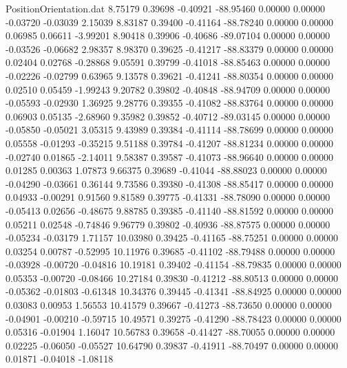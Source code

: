 \begin{filecontents}{PositionOrientation.dat}
   8.75179    0.39698   -0.40921   -88.95460    0.00000    0.00000   -0.03720   -0.03039    2.15039
   8.83187    0.39400   -0.41164   -88.78240    0.00000    0.00000    0.06985    0.06611   -3.99201
   8.90418    0.39906   -0.40686   -89.07104    0.00000    0.00000   -0.03526   -0.06682    2.98357
   8.98370    0.39625   -0.41217   -88.83379    0.00000    0.00000    0.02404    0.02768   -0.28868
   9.05591    0.39799   -0.41018   -88.85463    0.00000    0.00000   -0.02226   -0.02799    0.63965
   9.13578    0.39621   -0.41241   -88.80354    0.00000    0.00000    0.02510    0.05459   -1.99243
   9.20782    0.39802   -0.40848   -88.94709    0.00000    0.00000   -0.05593   -0.02930    1.36925
   9.28776    0.39355   -0.41082   -88.83764    0.00000    0.00000    0.06903    0.05135   -2.68960
   9.35982    0.39852   -0.40712   -89.03145    0.00000    0.00000   -0.05850   -0.05021    3.05315
   9.43989    0.39384   -0.41114   -88.78699    0.00000    0.00000    0.05558   -0.01293   -0.35215
   9.51188    0.39784   -0.41207   -88.81234    0.00000    0.00000   -0.02740    0.01865   -2.14011
   9.58387    0.39587   -0.41073   -88.96640    0.00000    0.00000    0.01285    0.00363    1.07873
   9.66375    0.39689   -0.41044   -88.88023    0.00000    0.00000   -0.04290   -0.03661    0.36144
   9.73586    0.39380   -0.41308   -88.85417    0.00000    0.00000    0.04933   -0.00291    0.91560
   9.81589    0.39775   -0.41331   -88.78090    0.00000    0.00000   -0.05413    0.02656   -0.48675
   9.88785    0.39385   -0.41140   -88.81592    0.00000    0.00000    0.05211    0.02548   -0.74846
   9.96779    0.39802   -0.40936   -88.87575    0.00000    0.00000   -0.05234   -0.03179    1.71157
  10.03980    0.39425   -0.41165   -88.75251    0.00000    0.00000    0.03254    0.00787   -0.52995
  10.11976    0.39685   -0.41102   -88.79488    0.00000    0.00000   -0.03928   -0.00720   -0.04816
  10.19181    0.39402   -0.41154   -88.79835    0.00000    0.00000    0.05353   -0.00720   -0.08466
  10.27184    0.39830   -0.41212   -88.80513    0.00000    0.00000   -0.05362   -0.01803   -0.61348
  10.34376    0.39445   -0.41341   -88.84925    0.00000    0.00000    0.03083    0.00953    1.56553
  10.41579    0.39667   -0.41273   -88.73650    0.00000    0.00000   -0.04901   -0.00210   -0.59715
  10.49571    0.39275   -0.41290   -88.78423    0.00000    0.00000    0.05316   -0.01904    1.16047
  10.56783    0.39658   -0.41427   -88.70055    0.00000    0.00000    0.02225   -0.06050   -0.05527
  10.64790    0.39837   -0.41911   -88.70497    0.00000    0.00000    0.01871   -0.04018   -1.08118

\end{filecontents}
